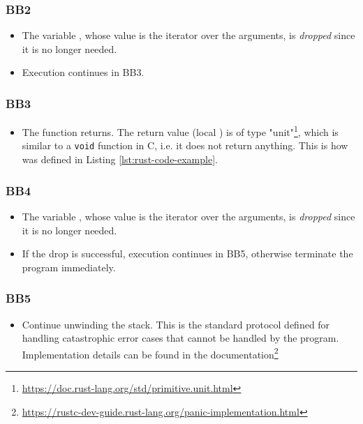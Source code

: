 \documentclass[../Thesis.tex]{subfiles}
\begin{document}
\subsubsection{BB2}

\begin{itemize}
    \item The variable , whose value is the iterator over the arguments,
          is \emph{dropped} since it is no longer needed.
    \item Execution continues in BB3.
\end{itemize}

\subsubsection{BB3}

\begin{itemize}
    \item The function returns.
          The return value (local ) is of type "unit"\footnote{\url{https://doc.rust-lang.org/std/primitive.unit.html}},
          which is similar to a \texttt{void} function in C, i.e. it does not return anything.
          This is how  was defined in Listing \ref{lst:rust-code-example}.
\end{itemize}

\subsubsection{BB4}

\begin{itemize}
    \item The variable , whose value is the iterator over the arguments,
          is \emph{dropped} since it is no longer needed.
    \item If the drop is successful, execution continues in BB5,
          otherwise terminate the program immediately.
\end{itemize}

\subsubsection{BB5}

\begin{itemize}
    \item Continue unwinding the stack.
          This is the standard protocol defined for handling catastrophic error cases
          that cannot be handled by the program.
          Implementation details can be found in the
          documentation\footnote{\url{https://rustc-dev-guide.rust-lang.org/panic-implementation.html}}
\end{itemize}
\end{document}
